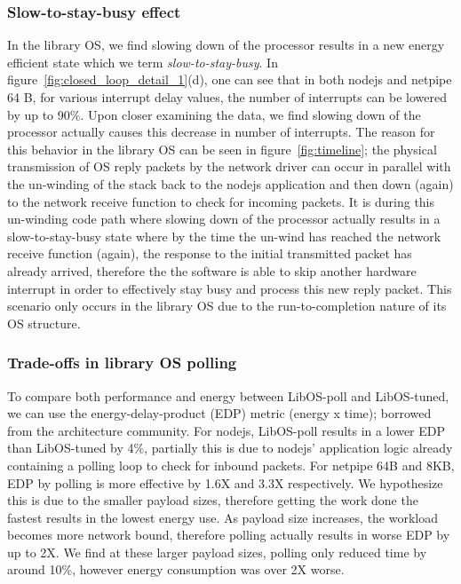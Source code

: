 \subsubsection{Slow-to-stay-busy effect}
In the library OS, we find slowing down of the processor results in a new energy efficient state which we term \textit{slow-to-stay-busy}. In figure~\ref{fig:closed_loop_detail_1}(d), one can see that in both nodejs and netpipe 64 B, for various interrupt delay values, the number of interrupts can be lowered by up to 90\%. Upon closer examining the data, we find slowing down of the processor actually causes this decrease in number of interrupts. The reason for this behavior in the library OS can be seen in figure~\ref{fig:timeline}; the physical transmission of OS reply packets by the network driver can occur in parallel with the un-winding of the stack back to the nodejs application and then down (again) to the network receive function to check for incoming packets. It is during this un-winding code path where slowing down of the processor actually results in a slow-to-stay-busy state where by the time the un-wind has reached the network receive function (again), the response to the initial transmitted packet has already arrived, therefore the the software is able to skip another hardware interrupt in order to effectively stay busy and process this new reply packet. This scenario only occurs in the library OS due to the run-to-completion nature of its OS structure.

\subsubsection{Trade-offs in library OS polling}
To compare both performance and energy between LibOS-poll and LibOS-tuned, we can use the energy-delay-product (EDP) metric (energy x time); borrowed from the architecture community. For nodejs, LibOS-poll results in a lower EDP than LibOS-tuned by 4\%, partially this is due to nodejs' application logic already containing a polling loop to check for inbound packets. For netpipe 64B and 8KB, EDP by polling is more effective by 1.6X and 3.3X respectively. We hypothesize this is due to the smaller payload sizes, therefore getting the work done the fastest results in the lowest energy use. As payload size increases, the workload becomes more network bound, therefore polling actually results in worse EDP by up to 2X. We find at these larger payload sizes, polling only reduced time by around 10\%, however energy consumption was over 2X worse.